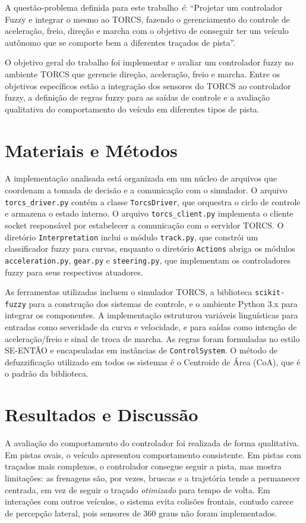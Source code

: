 \documentclass[12pt]{article}
\begin{document}
A quest\~ao-problema definida para este trabalho \emph{\'e}: ``Projetar um controlador Fuzzy e integrar o mesmo ao TORCS, fazendo o gerenciamento do controle de acelera\c{c}\~ao, freio, dire\c{c}\~ao e marcha com o objetivo de conseguir ter um ve\'iculo aut\^onomo que se comporte bem a diferentes tra\c{c}ados de pista''.

O objetivo geral do trabalho foi implementar e avaliar um controlador fuzzy no ambiente TORCS que gerencie dire\c{c}\~ao, acelera\c{c}\~ao, freio e marcha. Entre os objetivos espec\'ificos est\~ao a integra\c{c}\~ao dos sensores do TORCS ao controlador fuzzy, a defini\c{c}\~ao de regras fuzzy para as sa\'idas de controle e a avalia\c{c}\~ao qualitativa do comportamento do ve\'iculo em diferentes tipos de pista.

\section{Materiais e M\'etodos}
A implementa\c{c}\~ao analisada est\'a organizada em um n\'ucleo de arquivos que coordenam a tomada de decis\~ao e a comunica\c{c}\~ao com o simulador. O arquivo \texttt{torcs\_driver.py} cont\'em a classe \texttt{TorcsDriver}, que orquestra o ciclo de controle e armazena o estado interno. O arquivo \texttt{torcs\_client.py} implementa o cliente socket respons\'avel por estabelecer a comunica\c{c}\~ao com o servidor TORCS. O diret\'orio \texttt{Interpretation} inclui o m\'odulo \texttt{track.py}, que constr\'oi um classificador fuzzy para curvas, enquanto o diret\'orio \texttt{Actions} abriga os m\'odulos \texttt{acceleration.py}, \texttt{gear.py} e \texttt{steering.py}, que implementam os controladores fuzzy para seus respectivos atuadores.

As ferramentas utilizadas incluem o simulador TORCS, a biblioteca \texttt{scikit-fuzzy} \cite{skfuzzy} para a constru\c{c}\~ao dos sistemas de controle, e o ambiente Python 3.x para integrar os componentes. A implementa\c{c}\~ao estruturou vari\'aveis lingu\'isticas para entradas como severidade da curva e velocidade, e para sa\'idas como inten\c{c}\~ao de acelera\c{c}\~ao/freio e sinal de troca de marcha. As regras foram formuladas no estilo SE-ENT\~AO e encapsuladas em inst\^ancias de \texttt{ControlSystem}. O método de defuzzificação utilizado em todos os sistemas é o Centroide de Área (CoA), que é o padrão da biblioteca.

\section{Resultados e Discuss\~ao}
A avalia\c{c}\~ao do comportamento do controlador foi realizada de forma qualitativa. Em pistas ovais, o ve\'iculo apresentou comportamento consistente. Em pistas com tra\c{c}ados mais complexos, o controlador consegue seguir a pista, mas mostra limita\c{c}\~oes: as frenagens s\~ao, por vezes, bruscas e a trajet\'oria tende a permanecer centrada, em vez de seguir o tra\c{c}ado \emph{otimizado} para tempo de volta. Em intera\c{c}\~oes com outros ve\'iculos, o sistema evita colis\~oes frontais, contudo carece de percep\c{c}\~ao lateral, pois sensores de 360 graus n\~ao foram implementados.
\end{document}
